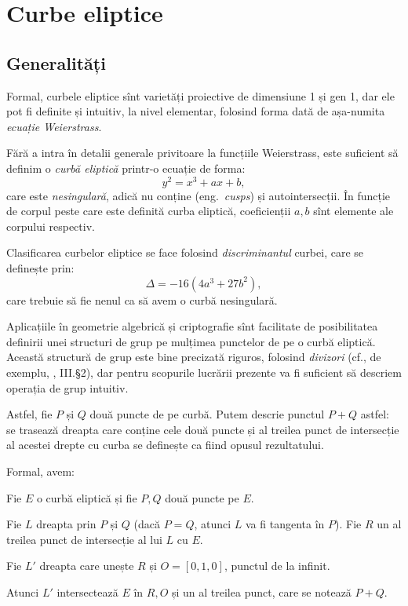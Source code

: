 
\chapter{Curbe eliptice}

\section{Generalități}

Formal, curbele eliptice sînt varietăți proiective de dimensiune 1 și gen 1,
dar ele pot fi definite și intuitiv, la nivel elementar, folosind forma
dată de așa-numita \emph{ecuație Weierstrass}.

Fără a intra în detalii generale privitoare la funcțiile Weierstrass, este
suficient să definim o \emph{curbă eliptică} printr-o ecuație de forma:
\[
  y^2 = x^3 + ax + b,
\]
care este \emph{nesingulară}, adică nu conține  (eng.\ \emph{cusps})
și autointersecții. În funcție de corpul peste care este definită curba
eliptică, coeficienții $ a, b $ sînt elemente ale corpului respectiv.

Clasificarea curbelor eliptice se face folosind \emph{discriminantul} curbei,
care se definește prin:
\[
  \Delta = -16(4a^3 + 27b^2),
\]
care trebuie să fie nenul ca să avem o curbă nesingulară.

Aplicațiile în geometrie algebrică și criptografie sînt facilitate de posibilitatea
definirii unei structuri de grup pe mulțimea punctelor de pe o curbă eliptică.
Această structură de grup este bine precizată riguros, folosind \emph{divizori}
(cf., de exemplu, \cite{sil09}, III.\S2), dar pentru scopurile lucrării prezente
va fi suficient să descriem operația de grup intuitiv.

Astfel, fie $ P $ și $ Q $ două puncte de pe curbă. Putem descrie punctul $ P + Q $
astfel: se trasează dreapta care conține cele două puncte și al treilea punct
de intersecție al acestei drepte cu curba se definește ca fiind opusul rezultatului.

Formal, avem:
\begin{definition}\label{def:adunare-pc}
  Fie $ E $ o curbă eliptică și fie $ P, Q $ două puncte pe $ E $.

  Fie $ L $ dreapta prin $ P $ și $ Q $ (dacă $ P = Q $, atunci $ L $ va
  fi tangenta în $ P $). Fie $ R $ un al treilea punct de intersecție al
  lui $ L $ cu $ E $.

  Fie $ L' $ dreapta care unește $ R $ și $ O = [0, 1, 0] $, punctul de la
  infinit.

  Atunci $ L' $ intersectează $ E $ în $ R, O $ și un al treilea punct,
  care se notează $ P + Q $.
\end{definition}

